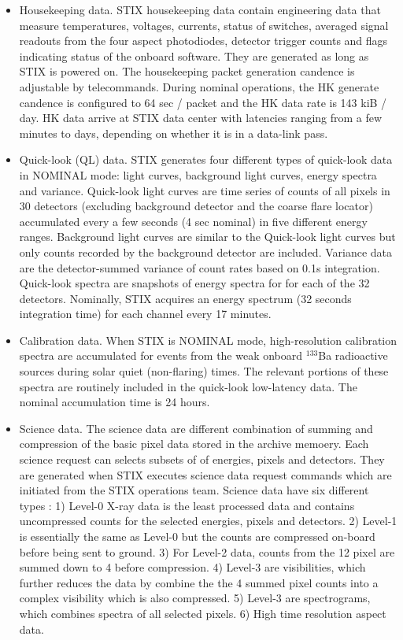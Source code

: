 \documentclass{aa}
\begin{document}
\begin{itemize}
 \item  Housekeeping data.
STIX housekeeping data contain engineering  data that measure temperatures, voltages, currents, status of switches,
averaged signal readouts from the four aspect photodiodes, detector trigger counts and  flags indicating
status of the onboard software.
They are generated as long as STIX is powered on.
The housekeeping packet generation candence is adjustable by telecommands.
During nominal operations, the HK generate candence is configured to 64 sec / packet and
the HK data rate is 143 kiB / day.
HK data arrive at STIX data center with latencies ranging from a few minutes to days, depending on whether
it is in a data-link pass.

\item Quick-look (QL) data.
STIX generates four different types of quick-look data in NOMINAL mode: light curves, background light curves, energy spectra and variance.
Quick-look light curves are  time series of counts
of all pixels in 30 detectors (excluding background detector and the coarse flare locator)
accumulated every a few seconds (4 sec nominal) in five different energy ranges.
Background light curves are similar to the Quick-look light curves but only
counts recorded by the background detector are included.
Variance data are
the detector-summed variance of count rates
based on 0.1s integration.
Quick-look spectra are snapshots of energy spectra for for each of the 32 detectors.
Nominally, STIX acquires an energy spectrum (32 seconds integration time) for each channel every 17 minutes.

\item
Calibration data. When STIX is NOMINAL mode, high-resolution calibration spectra  are accumulated for events from the weak onboard $^{133}$Ba
radioactive sources during solar quiet  (non-flaring)  times. The relevant portions of these
spectra are routinely included in the quick-look low-latency data.
The nominal accumulation time is 24 hours.

\item
Science data.  The science data are different combination of summing and compression of the basic pixel data stored in the archive memoery.
Each science request can selects subsets of of energies, pixels and detectors.
They are generated when  STIX executes
science data request commands which are initiated from the STIX operations team. Science data have six different types : 1)
Level-0 X-ray data is the least processed data and contains uncompressed counts for the selected energies, pixels and detectors.
2) Level-1 is essentially the same as Level-0 but the counts are compressed on-board before being sent to ground.
3) For Level-2 data,  counts from the 12 pixel are summed down to 4 before compression.
4) Level-3 are visibilities, which further reduces the data by combine the the 4 summed pixel counts into a complex visibility which is also compressed.
5) Level-3 are spectrograms, which combines spectra of all selected pixels.
6) High time resolution aspect data.
\end{itemize}
\end{document}
